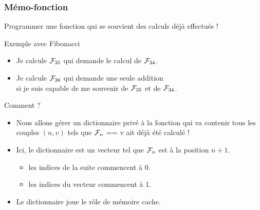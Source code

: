 \documentclass[10pt]{beamer}
\newcommand{\F}[1]{\ensuremath{{\cal F}_{#1}}\xspace}
\begin{document}
\begin{frame}
  \frametitle{Mémo-fonction}
  \alert{Programmer une fonction qui se souvient des calculs déjà effectués !}

  \begin{exampleblock}{Exemple avec Fibonacci}
    \begin{itemize}
    \item Je calcule \F{35} qui demande le calcul de \F{34}.
    \item Je calcule \F{36} qui demande une seule addition \\si je suis capable de me souvenir de \F{35} et de \F{34}.
    \end{itemize}
  \end{exampleblock}

  \begin{block}{Comment ?}
    \begin{itemize}
    \item Nous allons gérer un dictionnaire privé à la fonction qui va contenir tous les couples $(n, v)$ tels que \F{n} == v ait déjà été calculé !
    \item Ici, le dictionnaire est un vecteur tel que \F{n} est à la position $n+1$.
      \begin{itemize}
      \item les indices de la suite commencent à 0.
      \item les indices du vecteur commencent à 1.
      \end{itemize}
    \item<alert@1> Le dictionnaire joue le rôle de mémoire cache.
    \end{itemize}
\end{block}



\end{frame}
\end{document}
